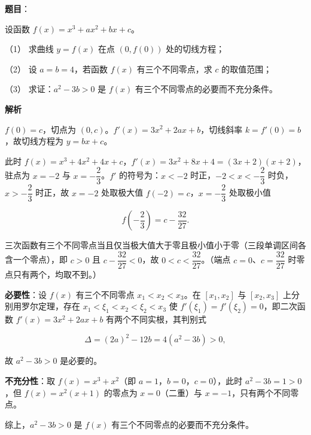 \begin{answer}

\textbf{题目}：

设函数 \(f(x)=x^{3}+ax^{2}+bx+c\)。

（1） 求曲线 \(y=f(x)\) 在点 \((0,f(0))\) 处的切线方程；

（2） 设 \(a=b=4\)，若函数 \(f(x)\) 有三个不同零点，求 \(c\) 的取值范围；

（3） 求证：\(a^{2}-3b>0\) 是 \(f(x)\) 有三个不同零点的必要而不充分条件。

\textbf{解析}


\(f(0)=c\)，切点为 \((0,c)\)。\(f'(x)=3x^{2}+2ax+b\)，切线斜率 \(k=f'(0)=b\)，故切线方程为 \(y=bx+c\)。


此时 \(f(x)=x^{3}+4x^{2}+4x+c\)，\(f'(x)=3x^{2}+8x+4=(3x+2)(x+2)\)，驻点为 \(x=-2\) 与 \(x=-\dfrac{2}{3}\)。\(f'\) 的符号为：\(x<-2\) 时正，\(-2<x<-\dfrac{2}{3}\) 时负，\(x>-\dfrac{2}{3}\) 时正，故 \(x=-2\) 处取极大值 \(f(-2)=c\)，\(x=-\dfrac{2}{3}\) 处取极小值

\nopagebreak[4]
\[
f\left(-\frac{2}{3}\right)=c-\frac{32}{27}.
\]

三次函数有三个不同零点当且仅当极大值大于零且极小值小于零（三段单调区间各含一个零点），即 \(c>0\) 且 \(c-\dfrac{32}{27}<0\)，故 \(0<c<\dfrac{32}{27}\)。（端点 \(c=0\)、\(c=\dfrac{32}{27}\) 时零点只有两个，均取不到。）


\textbf{必要性}：设 \(f(x)\) 有三个不同零点 \(x_1<x_2<x_3\)。在 \([x_1,x_2]\) 与 \([x_2,x_3]\) 上分别用罗尔定理，存在 \(x_1<\xi_1<x_2<\xi_2<x_3\) 使 \(f'(\xi_1)=f'(\xi_2)=0\)，即二次函数 \(f'(x)=3x^{2}+2ax+b\) 有两个不同实根，其判别式

\nopagebreak[4]
\[
\Delta=(2a)^{2}-12b=4(a^{2}-3b)>0,
\]

故 \(a^{2}-3b>0\) 是必要的。

\textbf{不充分性}：取 \(f(x)=x^{3}+x^{2}\)（即 \(a=1\)，\(b=0\)，\(c=0\)），此时 \(a^{2}-3b=1>0\)，但 \(f(x)=x^{2}(x+1)\) 的零点为 \(x=0\)（二重）与 \(x=-1\)，只有两个不同零点。

综上，\(a^{2}-3b>0\) 是 \(f(x)\) 有三个不同零点的必要而不充分条件。




\end{answer}